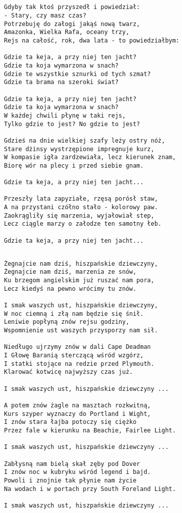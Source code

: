 \documentclass[12pt]{article}
\begin{document}
\subsection*{}
\begin{verbatim}
Gdyby tak ktoś przyszedł i powiedział:
- Stary, czy masz czas?
Potrzebuję do załogi jakąś nową twarz,
Amazonka, Wielka Rafa, oceany trzy,
Rejs na całość, rok, dwa lata - to powiedziałbym:

Gdzie ta keja, a przy niej ten jacht?
Gdzie ta koja wymarzona w snach?
Gdzie te wszystkie sznurki od tych szmat?
Gdzie ta brama na szeroki świat?

Gdzie ta keja, a przy niej ten jacht?
Gdzie ta koja wymarzona w snach?
W każdej chwili płynę w taki rejs,
Tylko gdzie to jest? No gdzie to jest?

Gdzieś na dnie wielkiej szafy leży ostry nóż,
Stare dżinsy wystrzępione impregnuje kurz,
W kompasie igła zardzewiała, lecz kierunek znam,
Biorę wór na plecy i przed siebie gnam.

Gdzie ta keja, a przy niej ten jacht...

Przeszły lata zapyziałe, rzęsą porósł staw,
A na przystani czółno stało - kolorowy paw.
Zaokrągliły się marzenia, wyjałowiał step,
Lecz ciągle marzy o załodze ten samotny łeb.

Gdzie ta keja, a przy niej ten jacht...
\end{verbatim}
\clearpage


\subsection*{}
\begin{verbatim}
Żegnajcie nam dziś, hiszpańskie dziewczyny,
Żegnajcie nam dziś, marzenia ze snów,
Ku brzegom angielskim już ruszać nam pora,
Lecz kiedyś na pewno wrócimy tu znów.

I smak waszych ust, hiszpańskie dziewczyny,
W noc ciemną i złą nam będzie się śnił.
Leniwie popłyną znów rejsu godziny,
Wspomnienie ust waszych przysporzy nam sił.

Niedługo ujrzymy znów w dali Cape Deadman
I Głowę Baranią sterczącą wśród wzgórz,
I statki stojące na redzie przed Plymouth.
Klarować kotwicę najwyższy czas już.

I smak waszych ust, hiszpańskie dziewczyny ...

A potem znów żagle na masztach rozkwitną,
Kurs szyper wyznaczy do Portland i Wight,
I znów stara łajba potoczy się ciężko
Przez fale w kierunku na Beachie, Fairlee Light.

I smak waszych ust, hiszpańskie dziewczyny ...

Zabłysną nam bielą skał zęby pod Dover
I znów noc w kubryku wśród legend i bajd.
Powoli i znojnie tak płynie nam życie
Na wodach i w portach przy South Foreland Light.

I smak waszych ust, hiszpańskie dziewczyny ...
\end{verbatim}
\clearpage
\end{document}

